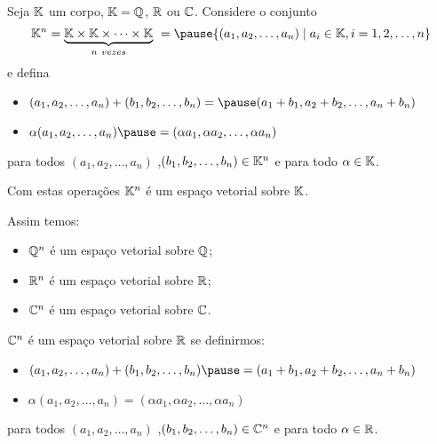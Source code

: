 \documentclass{beamer}
\begin{document}
\begin{frame}
    \begin{exemplos}
        Seja $\mathbb{K}$ um corpo, \pause $\mathbb{K} = \mathbb{Q}$, $\mathbb{R}$ ou $\mathbb{C}$. \pause Considere o conjunto
            \[
                \cp{K}^n = \underbrace{\cp{K} \times \cp{K} \times \cdots \times \cp{K}}_{n\ vezes}\ = \pause \{(a_1, a_2,\dots,a_n) \mid a_i \in \cp{K}, i =1, 2, \dots, n\}
            \]
            e defina
            \begin{itemize}[label=$\color{blue}\bullet$]
                \item $(a_1, a_2, \dots, a_n) + (b_1, b_2, \dots,b_n) =\pause (a_1 + b_1, a_2 + b_2,\dots, a_n + b_n)$\pause

                \item $\alpha (a_1, a_2, \dots,a_n) \pause= (\alpha a_1, \alpha a_2, \dots, \alpha a_n)$\pause
            \end{itemize}
            para todos $(a_1, a_2, \dots,a_n)$ ,$(b_1, b_2, \dots,b_n) \in \mathbb{K}^n$ \pause e para todo $\alpha \in \mathbb{K}$.\pause

            \vspace*{.2cm}

            Com estas operações $\mathbb{K}^n$ é um espaço vetorial sobre $\mathbb{K}$.\pause

            \vspace*{.2cm}

            Assim temos:\pause
                \begin{itemize}[label=$\color{blue}\blacktriangleright$]
                    \item $\mathbb{Q}^n$ \pause é um espaço vetorial sobre $\mathbb{Q}$;\pause
                    \item $\mathbb{R}^n$ \pause é um espaço vetorial sobre $\mathbb{R}$;\pause
                    \item $\mathbb{C}^n$ \pause é um espaço vetorial sobre $\mathbb{C}$.
                \end{itemize}
    \end{exemplos}
\end{frame}

\begin{frame}
    \begin{exemplos}
    $\mathbb{C}^n$ \pause é um espaço vetorial sobre $\mathbb{R}$ \pause se definirmos:\pause
        \begin{itemize}[label=$\color{blue}\bullet$]
            \item $(a_1, a_2, \dots, a_n) + (b_1, b_2, \dots,b_n) \pause = (a_1 + b_1, a_2 + b_2,\dots, a_n + b_n)$\pause
            \item $\alpha (a_1, a_2, \dots,a_n) = (\alpha a_1, \alpha a_2, \dots, \alpha a_n)$\pause
        \end{itemize}
        para todos $(a_1, a_2, \dots,a_n)$ ,$(b_1, b_2, \dots,b_n) \in \mathbb{C}^n$ \pause e para todo $\alpha \in \mathbb{R}$.
    \end{exemplos}
\end{frame}
\end{document}
